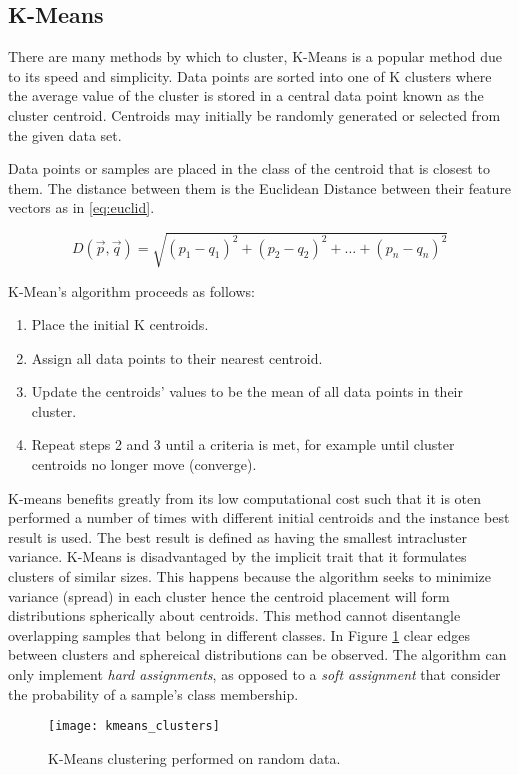 \subsection{K-Means}
There are many methods by which to cluster, K-Means is a popular method due to its speed and simplicity. Data points are sorted into one of K clusters where the average value of the cluster is stored in a central data point known as the cluster centroid. Centroids may initially be randomly generated or selected from the given data set. 

Data points or samples are placed in the class of the centroid that is closest to them. The distance between them is the Euclidean Distance between their feature vectors as in \ref{eq:euclid}. 

\begin{equation}
    D(\vec{p},\vec{q}) = \sqrt{(p_1 - q_1)^2 + (p_2 - q_2)^2 +\hdots + (p_n - q_n)^2}
    \label{eq:euclid}
\end{equation} 

K-Mean's algorithm proceeds as follows:
    \begin{enumerate}
    \itemsep0em
        \item Place the initial K centroids.
        \item Assign all data points to their nearest centroid.
        \item Update the centroids' values to be the mean of all data points in their cluster.
        \item Repeat steps 2 and 3 until a criteria is met, for example until cluster centroids no longer move (converge).
    \end{enumerate}

K-means benefits greatly from its low computational cost such that it is oten performed a number of times with different initial centroids and the instance best result is used. The best result is defined as having the smallest intracluster variance. K-Means is disadvantaged by the implicit trait that it formulates clusters of similar sizes. This happens because the algorithm seeks to minimize variance (spread) in each cluster hence the  centroid placement will form distributions spherically about centroids. This method cannot disentangle overlapping samples that belong in different classes. In Figure \ref{fig:clusters} clear edges between clusters and sphereical distributions can be observed. The algorithm can only implement \emph{hard assignments}, as opposed to a \emph{soft assignment} that consider the probability of a sample's class membership. 



\begin{figure}[H]
    \centering
    \centering\texttt{[image: kmeans\_clusters]}
    \caption{K-Means clustering performed on random data.}
    \label{fig:clusters}
\end{figure} 